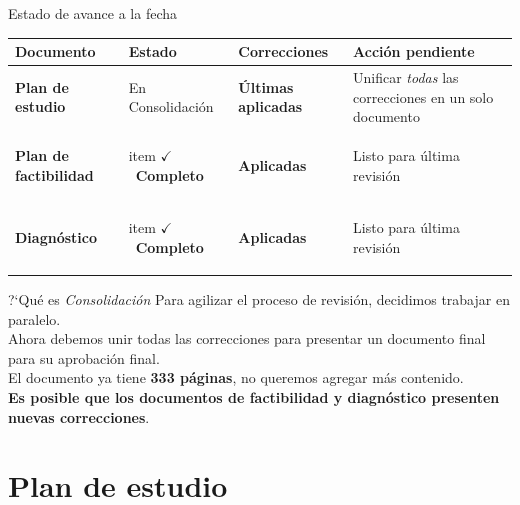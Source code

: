 \documentclass[10pt,aspectratio=169]{beamer}
\newcommand{\doc}[1]{\textbf{\textcolor{accentblue}{#1}}}
\newcommand{\estado}[1]{\textcolor{accentgreen}{\textbf{#1}}}
\newcommand{\estadoverde}[2][\textwidth]{%
  \begin{beamercolorbox}[wd=#1,sep=0.6ex,rounded=true]{item}
    \textcolor{accentgreen}{$\checkmark$\ \textbf{#2}}
  \end{beamercolorbox}}
\begin{document}
\begin{frame}{Estado de avance a la fecha}
  \small
  \begin{center}
      \begin{tabular}{@{}
        >{\raggedright\arraybackslash}p{3.2cm}
        >{\raggedright\arraybackslash}p{2.7cm}
        >{\raggedright\arraybackslash}p{2.8cm}
        >{\raggedright\arraybackslash}p{\dimexpr\textwidth-8.7cm-6\tabcolsep\relax}@{}}
    \toprule
    \textbf{Documento} & \textbf{Estado} & \textbf{Correcciones} &
    \textbf{Acción pendiente} \\
    \midrule
    \doc{Plan de estudio}
    & \textcolor{accentorange}{En Consolidación}
      & \estado{Últimas aplicadas}
      & Unificar \emph{todas} las correcciones en un solo documento \\
    \doc{Plan de factibilidad}
      & \estadoverde[\linewidth]{Completo}
      & \estado{Aplicadas}
      & Listo para última revisión \\
    \doc{Diagnóstico}
      & \estadoverde[\linewidth]{Completo}
      & \estado{Aplicadas}
      & Listo para última revisión \\
    \bottomrule
  \end{tabular}
  \end{center}

  \medskip
  \begin{block}{?`Qué es \emph{Consolidación}}
    \footnotesize
    Para agilizar el proceso de revisión, decidimos trabajar en paralelo. \\
    Ahora debemos unir todas las correcciones para presentar un documento final para su aprobación final.\\
    El documento ya tiene \estado{333 páginas}, no queremos agregar más contenido.\\
    \textbf{Es posible que los documentos de factibilidad y diagnóstico presenten nuevas correcciones}.
  \end{block}
\end{frame}

\section{Plan de estudio}
\end{document}
